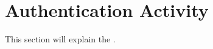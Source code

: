 \section{Authentication Activity}
This section will explain the .



\begin{lstlisting}[style=sourceCode, language=JAVA, caption=This is code, label=lst:authenticationAcitivity] 

\end{lstlisting}